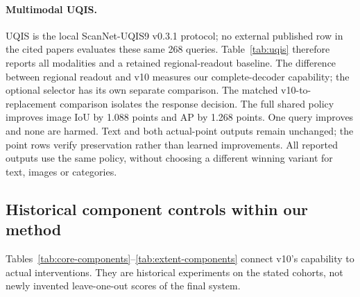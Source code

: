 \begin{table}[ht]
\centering\small\resizebox{\linewidth}{!}{}
\caption{NVOS IoU. Our rows use all eight tasks. P denotes published values from
LUDVIG Tables 1/D~\cite{ludvig}, VCAR Table 1~\cite{vcar}, LEGO Table 1~\cite{lego}, WildSeg3D Table 1~\cite{wildseg3d}, and Trace3D Table 4~\cite{trace3d}.
VCAR uses seven targets; LEGO reports seven scenes, without a verified matching
target roster. These recent rows are contextual, not same-protocol reproductions.
R averages all three seeds in each task. O uses our declared reference/source
contract. New NVOS evidence variants are reported as controlled extensions.}
\label{tab:nvos}
\end{table}

\paragraph{Multimodal UQIS.}
UQIS is the local ScanNet-UQIS9 v0.3.1 protocol; no external published row in
the cited papers evaluates these same 268 queries. Table~\ref{tab:uqis} therefore
reports all modalities and a retained regional-readout baseline. The difference
between regional readout and v10 measures our complete-decoder capability;
the optional selector has its own separate comparison. The matched v10-to-replacement comparison isolates the
response decision. The full
shared policy improves image IoU by 1.088 points and AP by 1.268 points. One
query improves and none are harmed. Text and both actual-point outputs remain
unchanged; the point rows verify preservation rather than learned improvements.
All reported outputs use the same policy, without choosing a different winning
variant for text, images or categories.
\begin{table}[ht]
\centering\small\resizebox{\linewidth}{!}{}
\caption{UQIS matched comparison. T/I/P2/P3 denote text, image, 2D point and 3D
point. Actual selected-set IoU and continuous-response AP are distinct metrics.}
\label{tab:uqis}
\end{table}

\subsection{Historical component controls within our method}
Tables~\ref{tab:core-components}--\ref{tab:extent-components} connect v10's
capability to actual interventions. They are historical experiments on the
stated cohorts, not newly invented leave-one-out scores of the final system.

